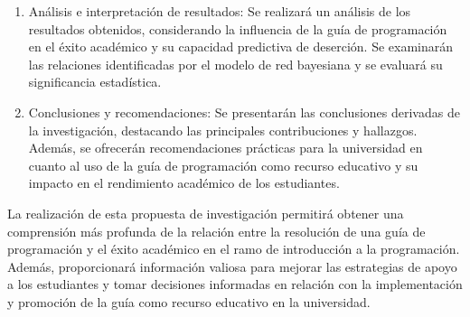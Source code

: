 \begin{enumerate}
    \item Análisis e interpretación de resultados: Se realizará un análisis de los resultados obtenidos, considerando la influencia de la guía de programación en el éxito académico y su capacidad predictiva de deserción. Se examinarán las relaciones identificadas por el modelo de red bayesiana y se evaluará su significancia estadística.

    \item Conclusiones y recomendaciones: Se presentarán las conclusiones derivadas de la investigación, destacando las principales contribuciones y hallazgos. Además, se ofrecerán recomendaciones prácticas para la universidad en cuanto al uso de la guía de programación como recurso educativo y su impacto en el rendimiento académico de los estudiantes.
\end{enumerate}

La realización de esta propuesta de investigación permitirá obtener una comprensión más profunda de la relación entre la resolución de una guía de programación y el éxito académico en el ramo de introducción a la programación. Además, proporcionará información valiosa para mejorar las estrategias de apoyo a los estudiantes y tomar decisiones informadas en relación con la implementación y promoción de la guía como recurso educativo en la universidad.